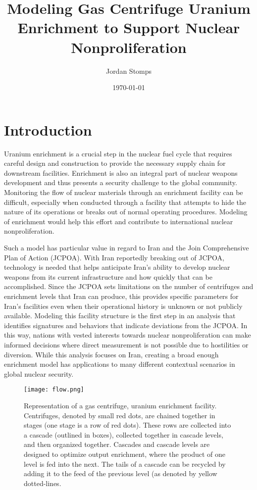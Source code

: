 \documentclass{article}
\title{Modeling Gas Centrifuge Uranium Enrichment to Support Nuclear Nonproliferation}
\author{Jordan Stomps}
\date{\today}
\begin{document}
\maketitle

\section{Introduction}

Uranium enrichment is a crucial step in the nuclear fuel cycle that requires careful design and construction to provide the necessary supply chain for downstream facilities. Enrichment is also an integral part of nuclear weapons development and thus presents a security challenge to the global community. Monitoring the flow of nuclear materials through an enrichment facility can be difficult, especially when conducted through a facility that attempts to hide the nature of its operations or breaks out of normal operating procedures. Modeling of enrichment would help this effort and contribute to international nuclear nonproliferation.

Such a model has particular value in regard to Iran and the Join Comprehensive Plan of Action (JCPOA). With Iran reportedly breaking out of JCPOA, technology is needed that helps anticipate Iran's ability to develop nuclear weapons from its current infrastructure and how quickly that can be accomplished. Since the JCPOA sets limitations on the number of centrifuges and enrichment levels that Iran can produce, this provides specific parameters for Iran’s facilities even when their operational history is unknown or not publicly available. Modeling this facility structure is the first step in an analysis that identifies signatures and behaviors that indicate deviations from the JCPOA. In this way, nations with vested interests towards nuclear nonproliferation can make informed decisions where direct measurement is not possible due to hostilities or diversion. While this analysis focuses on Iran, creating a broad enough enrichment model has applications to many different contextual scenarios in global nuclear security.

\begin{figure}[t!]
    \centering
    \texttt{[image: flow.png]}
    \caption{Representation of a gas centrifuge, uranium enrichment facility. Centrifuges, denoted by small red dots, are chained together in stages (one stage is a row of red dots). These rows are collected into a cascade (outlined in boxes), collected together in cascade levels, and then organized together. Cascades and cascade levels are designed to optimize output enrichment, where the product of one level is fed into the next. The tails of a cascade can be recycled by adding it to the feed of the previous level (as denoted by yellow dotted-lines.}
    \label{fig:cascades}
\end{figure}
\end{document}
